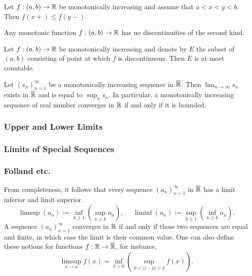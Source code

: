 \documentclass[12pt]{article} %
\begin{document}
\begin{corollary}
    Let $f : (a, b) \to \mathbb{R}$ be monotonically increasing and assume that $a < x < y < b$. Then $f(x+) \leq f(y-)$.
\end{corollary}

\begin{corollary}
    Any monotonic function $f : (a, b) \to \mathbb{R}$ has no discontinuities of the second kind.
\end{corollary}

\begin{theorem}
    Let $f : (a, b) \to \mathbb{R}$ be monotonically increasing and denote by $E$ the subset of $(a, b)$ consisting of point at which $f$ is discontinuous. Then $E$ is at most countable.
\end{theorem}

\begin{theorem}
    Let $(s_n)_{n=1}^{\infty}$ be a monotonically increasing sequence in $\overline{\mathbb{R}}$. Then $\lim_{n \to \infty} s_n$ exists in $\overline{\mathbb{R}}$ and is equal to $\sup_n s_n$. In particular, a monotonically increasing sequence of real number converges in $\mathbb{R}$ if and only if it is bounded.
\end{theorem}

\subsubsection{Upper and Lower Limits}


\subsubsection{Limits of Special Sequences}



\subsubsection{Folland etc.}

From completeness, it follows that every sequence $(a_n)_{n=1}^{\infty}$ in $\overline{\mathbb{R}}$ has a limit inferior and limit superior. \[\limsup(a_n) := \inf_{k \geq 1} \left(\sup_{n \geq k} a_n \right), \ \ \ \ \ \ \liminf(a_n) := \sup_{k \geq 1} \left( \inf_{n \geq k} a_n \right).\]
A sequence $(a_n)_{n=1}^{\infty}$ converges in $\mathbb{R}$ if and only if these two sequences are equal and finite, in which case the limit is their common value. One can also define these notions for functions $f : \mathbb{R} \to \overline{\mathbb{R}}$, for instance, \[\limsup_{x \to a} f(x) = \inf_{\delta > 0} \left( \sup_{0 < |z-a| < \delta} f(x) \right).\]
\end{document}
